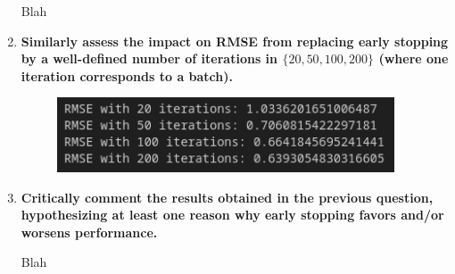 \documentclass[12pt]{article}
\begin{document}
\begin{enumerate}[leftmargin=\labelsep]
          Blah

    \item \textbf{Similarly assess the impact on RMSE from replacing early stopping by a well-defined
          number of iterations in $\{20,50,100,200\}$ (where one iteration corresponds to a batch).}

           \vskip 0.3cm
          
          \begin{figure}[H]
              \includegraphics[width=10cm]{./assets/rmse_iters_ex3_PartII.png}
              \label{fig:PartII-ex3}
          \end{figure}

    \item \textbf{Critically comment the results obtained in the previous question, hypothesizing at least
          one reason why early stopping favors and/or worsens performance.}

          \vskip 0.3cm
          Blah
\end{enumerate}
\end{document}
